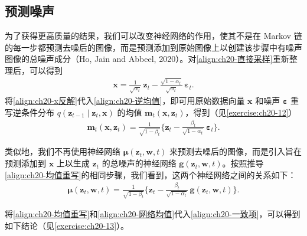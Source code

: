 \documentclass[../../main.tex]{subfiles}
\begin{document}
\subsection{预测噪声}\label{subsection:ch20-预测噪声}

为了获得更高质量的结果，我们可以改变神经网络的作用，使其不是在 Markov 链的每一步都预测去噪后的图像，而是预测添加到原始图像上以创建该步骤中有噪声图像的总噪声成分（Ho, Jain and Abbeel, 2020）。对\eqref{align:ch20-直接采样}重新整理后，可以得到
\begin{align}
\bm{x}=\frac{1}{\sqrt{\alpha_t}}\,\bm{z}_t-\frac{\sqrt{1-\alpha_t}}{\sqrt{\alpha_t}}\,\bm{\varepsilon}_t.
\label{align:ch20-x反解}
\end{align}
将\eqref{align:ch20-x反解}代入\eqref{align:ch20-逆均值}，即可用原始数据向量 $\bm{x}$ 和噪声 $\bm{\varepsilon}$ 重写逆条件分布 $q(\bm{z}_{t-1}\mid\bm{z}_t,\bm{x})$ 的均值 $\bm{m}_t(\bm{x},\bm{z}_t)$，得到（见\cref{exercise:ch20-12}）
\begin{align}
\bm{m}_t(\bm{x},\bm{z}_t)=\frac{1}{\sqrt{1-\beta_t}}\Big\{\bm{z}_t-\frac{\beta_t}{\sqrt{1-\alpha_t}}\,\bm{\varepsilon}_t\Big\}.
\label{align:ch20-均值重写}
\end{align}

类似地，我们不再使用神经网络 $\bm{\mu}(\bm{z}_t,\bm{w},t)$ 来预测去噪后的图像，而是引入旨在预测添加到 $\bm{x}$ 上以生成 $\bm{z}_t$ 的总噪声的神经网络 $\bm{g}(\bm{z}_t,\bm{w},t)$。按照推导\eqref{align:ch20-均值重写}的相同步骤，我们看到，这两个神经网络之间的关系如下：
\begin{align}
\bm{\mu}(\bm{z}_t,\bm{w},t)=\frac{1}{\sqrt{1-\beta_t}}\Big\{\bm{z}_t-\frac{\beta_t}{\sqrt{1-\alpha_t}}\,\bm{g}(\bm{z}_t,\bm{w},t)\Big\}.
\label{align:ch20-网络均值}
\end{align}

将\eqref{align:ch20-均值重写}和\eqref{align:ch20-网络均值}代入\eqref{align:ch20-一致项}，可以得到如下结论（见\cref{exercise:ch20-13}）。
\end{document}
